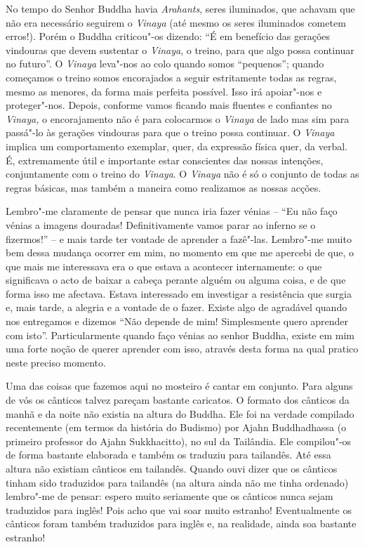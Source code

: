 No tempo do Senhor Buddha havia \emph{Arahants}, seres iluminados, que
achavam que não era necessário seguirem o \emph{Vinaya} (até mesmo os
seres iluminados cometem erros!). Porém o Buddha criticou"-os dizendo:
``É em benefício das gerações vindouras que devem sustentar o
\emph{Vinaya}, o treino, para que algo possa continuar no futuro''. O
\emph{Vinaya} leva"-nos ao colo quando somos ``pequenos''; quando
começamos o treino somos encorajados a seguir estritamente todas as
regras, mesmo as menores, da forma mais perfeita possível. Isso irá
apoiar"-nos e proteger"-nos. Depois, conforme vamos ficando mais fluentes
e confiantes no \emph{Vinaya,} o encorajamento não é para colocarmos o
\emph{Vinaya} de lado mas sim para passá"-lo às gerações vindouras para
que o treino possa continuar. O \emph{Vinaya} implica um comportamento
exemplar, quer, da expressão física quer, da verbal. É, extremamente
útil e importante estar conscientes das nossas intenções, conjuntamente
com o treino do \emph{Vinaya}. O \emph{Vinaya} não é só o conjunto de
todas as regras básicas, mas também a maneira como realizamos as nossas
acções.

Lembro"-me claramente de pensar que nunca iria fazer vénias -- ``Eu não
faço vénias a imagens douradas! Definitivamente vamos parar ao inferno
se o fizermos!'' -- e mais tarde ter vontade de aprender a fazê"-las.
Lembro"-me muito bem dessa mudança ocorrer em mim, no momento em que me
apercebi de que, o que mais me interessava era o que estava a acontecer
internamente: o que significava o acto de baixar a cabeça perante alguém
ou alguma coisa, e de que forma isso me afectava. Estava interessado em
investigar a resistência que surgia e, mais tarde, a alegria e a vontade
de o fazer. Existe algo de agradável quando nos entregamos e dizemos
``Não depende de mim! Simplesmente quero aprender com isto''.
Particularmente quando faço vénias ao senhor Buddha, existe em mim uma
forte noção de querer aprender com isso, através desta forma na qual
pratico neste preciso momento.

Uma das coisas que fazemos aqui no mosteiro é cantar em conjunto. Para
alguns de vós os cânticos talvez pareçam bastante caricatos. O formato
dos cânticos da manhã e da noite não existia na altura do Buddha. Ele
foi na verdade compilado recentemente (em termos da história do Budismo)
por Ajahn Buddhadhassa (o primeiro professor do Ajahn Sukkhacitto), no
sul da Tailândia. Ele compilou"-os de forma bastante elaborada e também
os traduziu para tailandês. Até essa altura não existiam cânticos em
tailandês. Quando ouvi dizer que os cânticos tinham sido traduzidos para
tailandês (na altura ainda não me tinha ordenado) lembro"-me de pensar:
espero muito seriamente que os cânticos nunca sejam traduzidos para
inglês! Pois acho que vai soar muito estranho! Eventualmente os cânticos
foram também traduzidos para inglês e, na realidade, ainda soa bastante
estranho!

